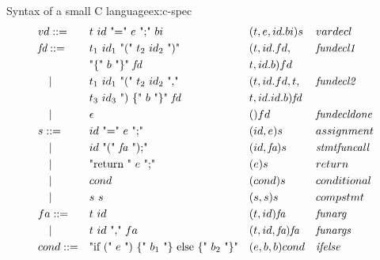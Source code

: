 \begin{example}{Syntax of a small C language}{ex:c-spec}
\[\begin{aligned}
       & vd ::=          &  & \text{$t$ $id$ "=" $e$ ";" $bi$}                       &  & (t,e,id.bi)s                  &  & vardecl              \\
       & \textit{fd} ::= &  & \text{$t_1$ $id_1$ "(" $t_2$ $id_2$ ")"}               &  & (t,id.fd,                     &  & \textit{fundecl1}    \\
       &                 &  & \text{"\{" $b$ "\}" \textit{fd}}                       &  & t,id.b)fd                                               \\
       & \quad |         &  & \text{$t_1$ $id_1$ "(" $t_2$ $id_2$ ","}               &  & (t,id.fd,t,                   &  & \textit{fundecl2}    \\
       &                 &  & \text{$t_3$ $id_3$ ") \{" $b$ "\}" $\textit{fd}$}      &  & t,id.id.b)\textit{fd}                                   \\
       & \quad |         &  & \text{$\epsilon$}                                      &  & ()fd                          &  & \textit{fundecldone} \\
       & s ::=           &  & \text{$id$ "=" $e$ ";"}                                &  & (id,e)s                       &  & assignment           \\
       & \quad |         &  & \text{$id$ "(" \textit{fa} ");"}                       &  & (id,\textit{fa})s             &  & \textit{stmtfuncall} \\
       & \quad |         &  & \text{"return " $e$ ";"}                               &  & (e)s                          &  & return               \\
       & \quad |         &  & \text{$cond$}                                          &  & (cond)s                       &  & conditional          \\
       & \quad |         &  & \text{$s$ $s$}                                         &  & (s,s)s                        &  & compstmt             \\
       & fa ::=          &  & \text{$t$ $id$}                                        &  & (t,id)\textit{fa}             &  & \textit{funarg}      \\
       & \quad |         &  & \text{$t$ $id$ "," $fa$}                               &  & (t,id,\textit{fa})\textit{fa} &  & \textit{funargs}     \\
       & cond ::=        &  & \text{"if (" $e$ ") \{" $b_1$ "\} else \{" $b_2$ "\}"} &  & (e,b,b)cond                   &  & \textit{ifelse}      \\

\end{aligned}\]
\end{example}
